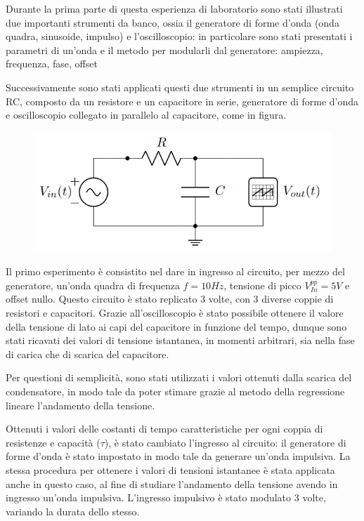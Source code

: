     Durante la prima parte di questa esperienza di laboratorio sono stati illustrati due
    importanti strumenti da banco, ossia il generatore di forme d'onda (onda quadra, sinusoide, impulso) e l'oscilloscopio: in particolare sono stati
    presentati i parametri di un'onda e il metodo per modularli dal generatore: ampiezza, frequenza, fase, offset \par
    Successivamente sono stati applicati questi due strumenti in un semplice circuito RC, composto da
    un resistore e un capacitore in serie, generatore di forme d'onda e oscilloscopio collegato in parallelo
    al capacitore, come in figura.

    \begin{figure}[!h]
        \begin{center}
            \includegraphics[width = 6 cm]{circuito.png}
        \end{center}
    \end{figure}
        
    Il primo esperimento è consistito nel dare in ingresso al circuito, per mezzo del generatore,
    un'onda quadra di frequenza $f = 10Hz$, tensione di picco $V_{In}^{pp} = 5V$ e offset nullo.
    Questo circuito è stato replicato 3 volte, con 3 diverse coppie di resistori e capacitori.
    Grazie all'oscilloscopio è stato possibile ottenere il valore della tensione di lato ai capi 
    del capacitore in funzione del tempo, dunque sono stati ricavati dei valori di tensione istantanea,
    in momenti arbitrari, sia nella fase di carica che di scarica del capacitore.  \par
    Per questioni di semplicità, sono stati utilizzati i valori ottenuti dalla scarica del condensatore, in modo tale
    da poter stimare grazie al metodo della regressione lineare l'andamento della tensione.\par
    Ottenuti i valori delle costanti di tempo caratteristiche per ogni coppia di resistenze e capacità ($\tau$),
    è stato cambiato l'ingresso al circuito: il generatore di forme d'onda è stato impostato in modo tale da generare
    un'onda impulsiva.
    La stessa procedura per ottenere i valori di tensioni istantanee è stata applicata anche in questo caso,
    al fine di studiare l'andamento della tensione avendo in ingresso un'onda impulsiva.
    L'ingresso impulsivo è stato modulato 3 volte, variando la durata dello stesso.    

